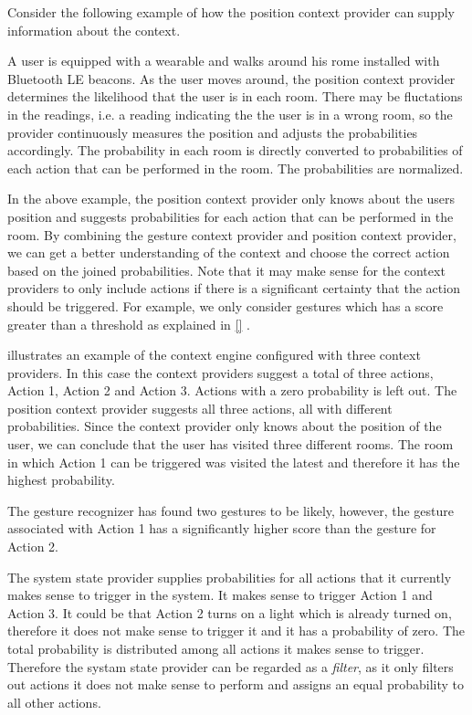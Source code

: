 Consider the following example of how the position context provider can supply information about the context.

\begin{testexample}
A user is equipped with a wearable and walks around his rome installed with Bluetooth LE beacons. As the user moves around, the position context provider determines the likelihood that the user is in each room. There may be fluctations in the readings, i.e. a reading indicating the the user is in a wrong room, so the provider continuously measures the position and adjusts the probabilities accordingly.
The probability in each room is directly converted to probabilities of each action that can be performed in the room. The probabilities are normalized.
\end{testexample}

In the above example, the position context provider only knows about the users position and suggests probabilities for each action that can be performed in the room. By combining the gesture context provider and position context provider, we can get a better understanding of the context and choose the correct action based on the joined probabilities. Note that it may make sense for the context providers to only include actions if there is a significant certainty that the action should be triggered. For example, we only consider gestures which has a score greater than a threshold as explained in \cref{} .

 illustrates an example of the context engine configured with three context providers. In this case the context providers suggest a total of three actions, Action 1, Action 2 and Action 3. Actions with a zero probability is left out. The position context provider suggests all three actions, all with different probabilities. Since the context provider only knows about the position of the user, we can conclude that the user has visited three different rooms. The room in which Action 1 can be triggered was visited the latest and therefore it has the highest probability.

The gesture recognizer has found two gestures to be likely, however, the gesture associated with Action 1 has a significantly higher score than the gesture for Action 2.

The system state provider supplies probabilities for all actions that it currently makes sense to trigger in the system. It makes sense to trigger Action 1 and Action 3. It could be that Action 2 turns on a light which is already turned on, therefore it does not make sense to trigger it and it has a probability of zero. The total probability is distributed among all actions it makes sense to trigger. Therefore the systam state provider can be regarded as a \textit{filter}, as it only filters out actions it does not make sense to perform and assigns an equal probability to all other actions.

